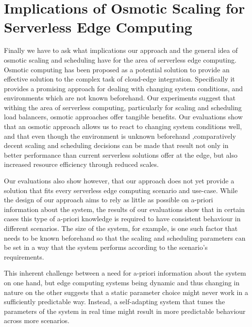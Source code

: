 \section{Implications of Osmotic Scaling for Serverless Edge Computing}

Finally we have to ask what implications our approach and the general idea of osmotic scaling and scheduling have for the area of serverless edge computing.
Osmotic computing has been proposed as a potential solution to provide an effective solution to the complex task of cloud-edge integration\cite{osmotic-middleware-rausch}.
Specifically it provides a promising approach for dealing with changing system conditions, and environments which are not known beforehand.
Our experiments suggest that withing the area of serverless computing, particularly for scaling and scheduling load balancers, osmotic approaches offer tangible benefits.
Our evaluations show that an osmotic approach allows us to react to changing system conditions well, and that even though the environment is unknown beforehand ,comparatively decent scaling and scheduling decisions can be made that result not only in better performance than current serverless solutions offer at the edge, but also increased resource efficiency through reduced scales.

Our evaluations also show however, that our approach does not yet provide a solution that fits every serverless edge computing scenario and use-case.
While the design of our approach aims to rely as little as possible on a-priori information about the system, the results of our evaluations show that in certain cases this type of a-priori knowledge is required to have consistent behaviour in different scenarios. 
The size of the system, for example, is one such factor that needs to be known beforehand so that the scaling and scheduling parameters can be set in a way that the system performs according to the scenario's requirements.

This inherent challenge between a need for a-priori information about the system on one hand, but edge computing systems being dynamic and thus changing in nature on the other suggests that a static parameter choice might never work in a sufficiently predictable way.
Instead, a self-adapting system that tunes the parameters of the system in real time might result in more predictable behaviour across more scenarios.

